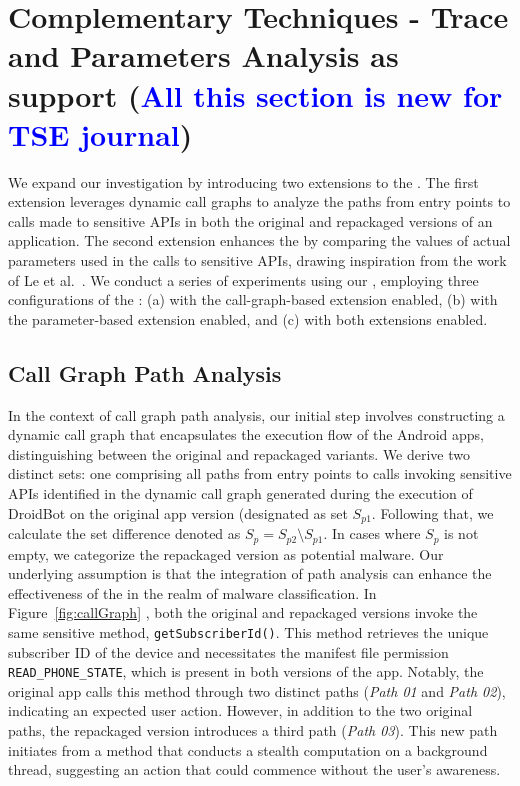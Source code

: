 \section{Complementary Techniques - Trace and Parameters Analysis as \mas support (\textcolor{blue}{All this section is new for TSE journal})}\label{sec:complementary}



We expand our investigation by introducing two extensions to the \mas. The first extension leverages dynamic call graphs
to analyze the paths from entry points to calls made to sensitive APIs in both the original and repackaged versions of an application.
The second extension enhances the \mas by comparing the values of actual parameters used in the calls to sensitive APIs,
drawing inspiration from the work of Le et al.~\cite{le2018towards}. We conduct a series of experiments using our \cds,
employing three configurations of the \mas: (a) with the call-graph-based extension enabled,
(b) with the parameter-based extension enabled, and (c) with both extensions enabled.

\subsection{Call Graph Path Analysis}

In the context of call graph path analysis, our initial step involves constructing a
dynamic call graph that encapsulates the execution flow of the Android apps,
distinguishing between the original and repackaged variants. We derive two distinct sets:
one comprising all paths from entry points to calls invoking sensitive APIs identified in the dynamic call graph generated during the execution of
DroidBot on the original app version (designated as set $S_{p1}$.
Following that, we calculate the set difference denoted as $S_p = S_{p2} \setminus S_{p1}$.
In cases where $S_p$ is not empty, we categorize the repackaged version as potential malware.
Our underlying assumption is that the integration of path analysis can enhance the effectiveness of
the \mas in the realm of malware classification.
In Figure~\ref{fig:callGraph} , both the original and repackaged
versions invoke the same sensitive method, \texttt{getSubscriberId()}.
This method retrieves the unique subscriber ID of the device and necessitates the manifest file
permission \texttt{READ\_PHONE\_STATE}, which is present in both versions of the app.
Notably, the original app calls this method through two distinct paths (\emph{Path 01} and \emph{Path 02}),
indicating an expected user action. However, in addition to the two original paths,
the repackaged version introduces a third path (\emph{Path 03}). This new path initiates
from a method that conducts a stealth computation on a background thread, suggesting an action that could
commence without the user's awareness.


